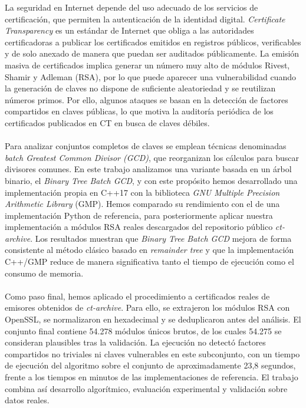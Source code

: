 La seguridad en Internet depende del uso adecuado de los servicios de certificación, que permiten la autenticación de la identidad digital. \textit{Certificate Transparency} es un estándar de Internet que obliga a las autoridades certificadoras a publicar los certificados emitidos en registros públicos, verificables y de solo anexado de manera que puedan ser auditados públicamente.
La emisión masiva de certificados implica generar un número muy alto de módulos Rivest, Shamir y Adleman (RSA), por lo que puede aparecer una vulnerabilidad cuando la generación de claves no dispone de suficiente aleatoriedad y se reutilizan números primos. Por ello, algunos ataques se basan en la detección de factores compartidos en claves públicas, lo que motiva la auditoría periódica de los certificados publicados en CT en busca de claves débiles.
\\
\\
Para analizar conjuntos completos de claves se emplean técnicas denominadas \textit{batch Greatest Common Divisor (GCD)}, que reorganizan los cálculos para buscar divisores comunes. En este trabajo analizamos una variante basada en un árbol binario, el \textit{Binary Tree Batch GCD}, y con este propósito hemos desarrollado una implementación propia en C++17 con la biblioteca \textit{GNU Multiple Precision Arithmetic Library} (GMP). Hemos comparado su rendimiento con el de una implementación Python de referencia, para posteriormente aplicar nuestra implementación a módulos RSA reales descargados del repositorio público \textit{ct-archive}. Los resultados muestran que \textit{Binary Tree Batch GCD} mejora de forma consistente al método clásico basado en \textit{remainder tree} y que la implementación C++/GMP reduce de manera significativa tanto el tiempo de ejecución como el consumo de memoria.
\\
\\
Como paso final, hemos aplicado el procedimiento a certificados reales de emisores obtenidos de \textit{ct-archive}. Para ello, se extrajeron los módulos RSA con
OpenSSL, se normalizaron en hexadecimal y se deduplicaron antes del análisis. El conjunto final contiene 54.278 módulos únicos brutos, de los cuales 54.275 se consideran plausibles tras la validación. La ejecución no detectó factores compartidos no triviales ni claves vulnerables en este subconjunto, con un tiempo de ejecución del algoritmo sobre el conjunto de aproximadamente 23,8 segundos, frente a los tiempos en minutos de las implementaciones de referencia. El trabajo combina así desarrollo algorítmico, evaluación experimental y validación sobre datos reales.
